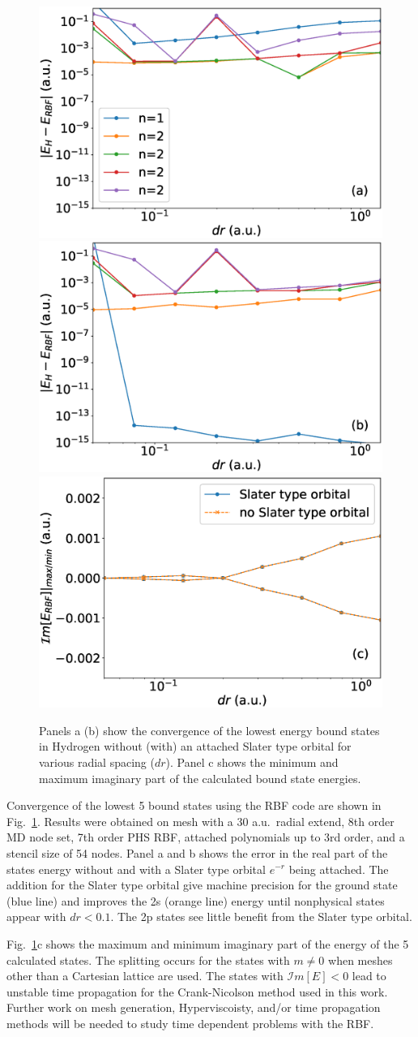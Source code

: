 \begin{figure}[t]
\centering
   \includegraphics[width=0.32\linewidth]{figs/rbf_no_exp.eps}
    \includegraphics[width=0.32\linewidth]{figs/rbf_with_exp.eps}
    \includegraphics[width=0.32\linewidth]{figs/rbf_imag.eps}
   
\caption{Panels a (b) show the convergence of the lowest energy bound states in Hydrogen without (with) an attached Slater type orbital for various radial spacing ($dr$). Panel c shows the minimum and maximum imaginary part of the calculated bound state energies.
} 
  \label{fig:rbf_conver}
\end{figure}

Convergence of the lowest 5 bound states using the RBF code are shown in Fig.~\ref{fig:rbf_conver}. Results were obtained on mesh with a 30 a.u.\ radial extend, 8th order MD node set, 7th order PHS RBF, attached polynomials up to 3rd order, and a stencil size of 54 nodes. Panel a and b shows the error in the real part of the states energy without and with a Slater type orbital $e^{-r}$ being attached. The addition for the Slater type orbital give machine precision for the ground state (blue line) and improves the 2s (orange line) energy until nonphysical states appear with $dr<0.1$. The 2p states see little benefit from the Slater type orbital.

Fig.~\ref{fig:rbf_conver}c shows the maximum and minimum imaginary part of the energy of the 5 calculated states. The splitting occurs for the states with $m\ne0$ when meshes other than a Cartesian  lattice are used. The states with $\mathcal{I}m[E]<0$ lead to unstable time propagation for the Crank-Nicolson method used in this work. Further work on mesh generation, Hyperviscoisty, and/or time propagation methods will be needed to study time dependent problems with the RBF.


